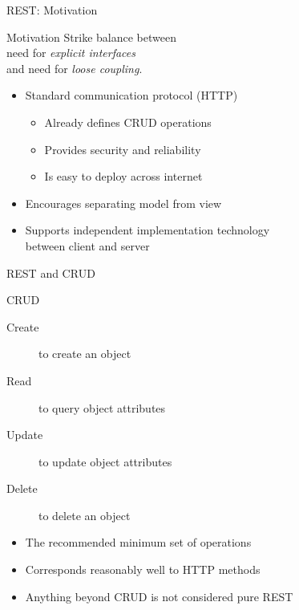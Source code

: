 \begin{frame}{REST: Motivation}
    \begin{block}{Motivation}
        Strike balance between \\ need for \emph{explicit interfaces} \\ and need for \emph{loose coupling}.
    \end{block}

    \medskip

    \begin{itemize}
        \item Standard communication protocol (HTTP)
        \begin{itemize}
            \item Already defines CRUD operations
            \item Provides security and reliability
            \item Is easy to deploy across internet
        \end{itemize}
        \item Encourages separating model from view
        \item Supports independent implementation technology \\ between client and server
    \end{itemize}
\end{frame}


\begin{frame}{REST and CRUD}
    \begin{block}{CRUD}
        \begin{description}
             \item[Create] to create an object
             \item[Read] to query object attributes
             \item[Update] to update object attributes
             \item[Delete] to delete an object
        \end{description}
    \end{block}

    \medskip

    \begin{itemize}
        \item The recommended minimum set of operations
        \item Corresponds reasonably well to HTTP methods
        \item Anything beyond CRUD is not considered pure REST
    \end{itemize}

\end{frame}


